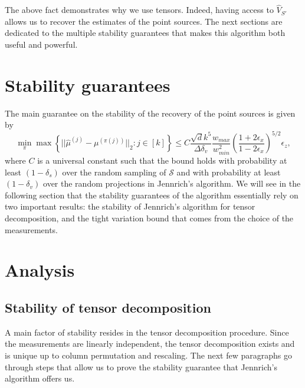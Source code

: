 The above fact demonstrates why we use tensors. Indeed, having access to $\widehat{V}_{S'}$ allows us to recover the estimates of the point sources. The next sections are dedicated to the multiple stability guarantees that makes this algorithm both useful and powerful.

\section{Stability guarantees}
The main guarantee on the stability of the recovery of the point sources is given by $$\min_\pi\max\left\{||\widehat{\mu}^{(j)}-\mu^{(\pi(j))}||_2:j\in[k]\right\}\leq C\frac{\sqrt{d}k^5}{\Delta\delta_v}\frac{w_{max}}{w_{min}^2}\left(\frac{1+2\epsilon_x}{1-2\epsilon_x}\right)^{5/2}\epsilon_z,$$ where $C$ is a universal constant such that the bound holds with probability at least $(1-\delta_s)$ over the random sampling of $\mathcal{S}$ and with probability at least $(1-\delta_v)$ over the random projections in Jennrich's algorithm. We will see in the following section that the stability guarantees of the algorithm essentially rely on two important results: the stability of Jennrich's algorithm for tensor decomposition, and the tight variation bound that comes from the choice of the measurements.
\section{Analysis}
\subsection{Stability of tensor decomposition}
A main factor of stability resides in the tensor decomposition procedure. Since the measurements are linearly independent, the tensor decomposition exists and is unique up to column permutation and rescaling. The next few paragraphs go through steps that allow us to prove the stability guarantee that Jennrich's algorithm offers us.

